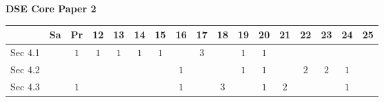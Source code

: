 \documentclass[12pt, a4paper]{article}
\begin{document}
\begin{absolutelynopagebreak}
\begin{center}
\textbf{DSE Core Paper 2}
\end{center}
\begin{center}
\begin{tabular}{|l|c|c|c|c|c|c|c|c|c|c|c|c|c|c|c|c|}
\hline
        & Sa & Pr & 12 & 13 & 14 & 15 & 16 & 17 & 18 & 19 & 20 & 21 & 22 & 23 & 24 & 25 \\\hline\hline
Sec 4.1 &  &  $1$ &  $1$ &  $1$ &  $1$ &  $1$ &  &  $3$ &  &  $1$ &  $1$ &  &  &  &  &  \\\hline
Sec 4.2 &  &  &  &  &  &  &  $1$ &  &  &  $1$ &  $1$ &  &  $2$ &  $2$ &  $1$ &  \\\hline
Sec 4.3 &  &  $1$ &  &  &  &  &  $1$ &  &  $3$ &  &  $1$ &  $2$ &  &  &  $1$ &  \\\hline
\end{tabular}
\end{center}
\end{absolutelynopagebreak}
\end{document}
